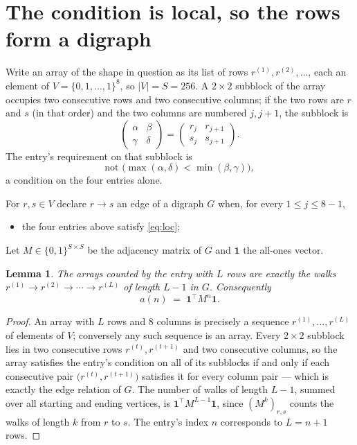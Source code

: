 \documentclass[11pt,a4paper]{article}
\theoremstyle{plain}
\newtheorem{lemma}[theorem]{Lemma}
\theoremstyle{definition}
\begin{document}
\section{The condition is local, so the rows form a digraph}

Write an array of the shape in question as its list of rows
$r^{(1)},r^{(2)},\dots$, each an element of
$V=\{0,1,\dots,1\}^{8}$, so $|V|=S=256$. A $2\times2$ subblock of the array
occupies two consecutive rows and two consecutive columns; if the two rows are $r$
and $s$ (in that order) and the two columns are numbered $j,j+1$,
the subblock is
\[
\begin{pmatrix}\alpha&\beta\\\gamma&\delta\end{pmatrix}=\begin{pmatrix}r_j&r_{j+1}\\s_j&s_{j+1}\end{pmatrix}.
\]
The entry's requirement on that subblock is
\begin{equation}\label{eq:loc}
\text{not }\bigl(\max(\alpha,\delta)<\min(\beta,\gamma)\bigr),
\end{equation}
a condition on the four entries alone.

For $r,s\in V$ declare $r\to s$ an edge of a digraph $G$ when, for every
$1\le j\le 8-1$,
\begin{itemize}
\item the four entries above satisfy \eqref{eq:loc};

\end{itemize}
Let $M\in\{0,1\}^{S\times S}$ be the adjacency matrix of $G$ and $\mathbf{1}$ the
all-ones vector.

\begin{lemma}\label{lem:walk}
The arrays counted by the entry with $L$ rows are exactly the walks
$r^{(1)}\to r^{(2)}\to\cdots\to r^{(L)}$ of length $L-1$ in $G$. Consequently
\[
a(n)\;=\;\mathbf{1}^{\!\top}M^{n}\mathbf{1} .
\]
\end{lemma}

\begin{proof}
An array with $L$ rows and $8$ columns is precisely a sequence
$r^{(1)},\dots,r^{(L)}$ of elements of $V$; conversely any such sequence is an array.
Every $2\times2$ subblock lies in two consecutive rows $r^{(t)},r^{(t+1)}$ and two
consecutive columns, so the array satisfies the entry's condition on all of its subblocks
if and only if each consecutive pair $\bigl(r^{(t)},r^{(t+1)}\bigr)$ satisfies it for
every column pair --- which is exactly the edge relation of $G$. The number of walks of
length $L-1$, summed over all starting and ending vertices, is
$\mathbf{1}^{\!\top}M^{L-1}\mathbf{1}$, since $(M^{k})_{r,s}$ counts the walks of
length $k$ from $r$ to $s$. The entry's index $n$ corresponds to $L=n+1$ rows.
\end{proof}
\end{document}
